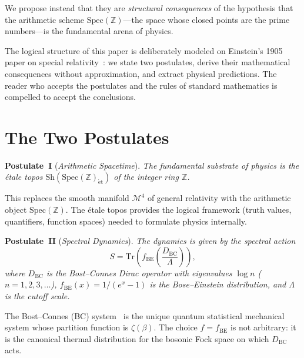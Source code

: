 \documentclass[aps,prl,twocolumn,superscriptaddress,nofootinbib]{revtex4-2}
\newcommand{\Spec}{\mathrm{Spec}}
\newcommand{\Sh}{\mathrm{Sh}}
\newcommand{\Tr}{\mathrm{Tr}}
\begin{document}
We propose instead that they are \emph{structural consequences} of
the hypothesis that the arithmetic scheme $\Spec(\mathbb{Z})$---the
space whose closed points are the prime numbers---is the fundamental
arena of physics.

The logical structure of this paper is deliberately modeled on
Einstein's 1905 paper on special relativity~\cite{Einstein1905}: we
state two postulates, derive their mathematical consequences without
approximation, and extract physical predictions.  The reader who
accepts the postulates and the rules of standard mathematics is
compelled to accept the conclusions.

\section{The Two Postulates}

\noindent\textbf{Postulate~I} (\emph{Arithmetic Spacetime}).
\textit{The fundamental substrate of physics is the \'etale topos
$\Sh(\Spec(\mathbb{Z})_{\mathrm{\acute{e}t}})$ of the integer ring
$\mathbb{Z}$.}

\medskip
\noindent This replaces the smooth manifold $\mathcal{M}^4$ of
general relativity with the arithmetic object $\Spec(\mathbb{Z})$.
The \'etale topos provides the logical framework (truth values,
quantifiers, function spaces) needed to formulate physics internally.

\medskip
\noindent\textbf{Postulate~II} (\emph{Spectral Dynamics}).
\textit{The dynamics is given by the spectral action
\begin{equation}
  \label{eq:master}
  S = \Tr\!\left(f_{\mathrm{BE}}\!\left(\frac{D_{\mathrm{BC}}}{\Lambda}\right)\right),
\end{equation}
where $D_{\mathrm{BC}}$ is the Bost--Connes Dirac operator with
eigenvalues $\log n$ ($n=1,2,3,\ldots$), $f_{\mathrm{BE}}(x) =
1/(e^x-1)$ is the Bose--Einstein distribution, and $\Lambda$ is the
cutoff scale.}

\medskip
\noindent The Bost--Connes (BC) system~\cite{BostConnes1995} is the
unique quantum statistical mechanical system whose partition function
is $\zeta(\beta)$.  The choice $f=f_{\mathrm{BE}}$ is not
arbitrary: it is the canonical thermal distribution for the bosonic
Fock space on which $D_{\mathrm{BC}}$ acts.

\end{document}
